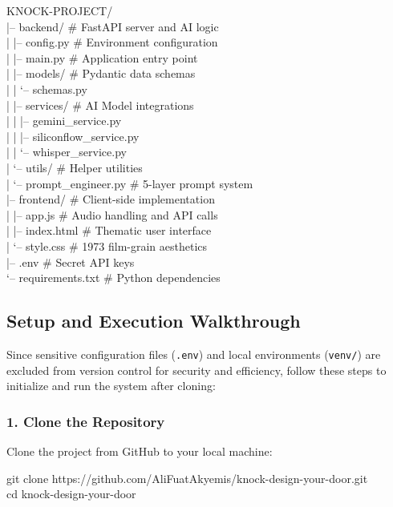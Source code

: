 \documentclass[12pt, a4paper]{article}
\begin{document}
\begin{codebox}
\small\ttfamily
KNOCK-PROJECT/\\
|-- backend/                \textcolor{midgray}{\# FastAPI server and AI logic}\\
|   |-- config.py           \textcolor{midgray}{\# Environment configuration}\\
|   |-- main.py             \textcolor{midgray}{\# Application entry point}\\
|   |-- models/             \textcolor{midgray}{\# Pydantic data schemas}\\
|   |   `-- schemas.py\\
|   |-- services/           \textcolor{midgray}{\# AI Model integrations}\\
|   |   |-- gemini\_service.py\\
|   |   |-- siliconflow\_service.py\\
|   |   `-- whisper\_service.py\\
|   `-- utils/              \textcolor{midgray}{\# Helper utilities}\\
|       `-- prompt\_engineer.py \textcolor{midgray}{\# 5-layer prompt system}\\
|-- frontend/               \textcolor{midgray}{\# Client-side implementation}\\
|   |-- app.js              \textcolor{midgray}{\# Audio handling and API calls}\\
|   |-- index.html          \textcolor{midgray}{\# Thematic user interface}\\
|   `-- style.css           \textcolor{midgray}{\# 1973 film-grain aesthetics}\\
|-- .env                    \textcolor{midgray}{\# Secret API keys}\\
`-- requirements.txt        \textcolor{midgray}{\# Python dependencies}
\end{codebox}

\subsection{Setup and Execution Walkthrough}

Since sensitive configuration files (\texttt{.env}) and local environments (\texttt{venv/}) are excluded from version control for security and efficiency, follow these steps to initialize and run the system after cloning:

\subsubsection{1. Clone the Repository}
Clone the project from GitHub to your local machine:
\begin{codebox}
\small\ttfamily
git clone https://github.com/AliFuatAkyemis/knock-design-your-door.git\\
cd knock-design-your-door
\end{codebox}
\end{document}
